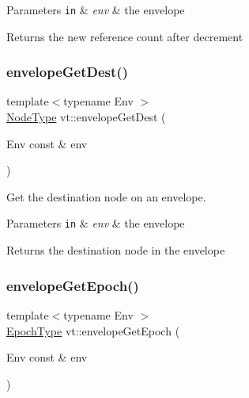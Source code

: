 \begin{DoxyParams}[1]{Parameters}
\mbox{\tt in}  & {\em env} & the envelope\\
\hline
\end{DoxyParams}
\begin{DoxyReturn}{Returns}
the new reference count after decrement 
\end{DoxyReturn}
\mbox{\label{namespacevt_a99cdbbb47f13203e14b01fa43bca99e9}} 
\subsubsection{\texorpdfstring{envelope\+Get\+Dest()}{envelopeGetDest()}}
{\footnotesize\ttfamily template$<$typename Env $>$ \\
\hyperlink{namespacevt_a866da9d0efc19c0a1ce79e9e492f47e2}{Node\+Type} vt\+::envelope\+Get\+Dest (\begin{DoxyParamCaption}\item[{Env const \&}]{env }\end{DoxyParamCaption})\hspace{0.3cm}{\ttfamily [inline]}}



Get the destination node on an envelope. 


\begin{DoxyParams}[1]{Parameters}
\mbox{\tt in}  & {\em env} & the envelope\\
\hline
\end{DoxyParams}
\begin{DoxyReturn}{Returns}
the destination node in the envelope 
\end{DoxyReturn}
\mbox{\label{namespacevt_ad5495e7900227550b44837e899c5bb13}} 
\subsubsection{\texorpdfstring{envelope\+Get\+Epoch()}{envelopeGetEpoch()}}
{\footnotesize\ttfamily template$<$typename Env $>$ \\
\hyperlink{namespacevt_a985a5adf291c34a3ca263b3378388236}{Epoch\+Type} vt\+::envelope\+Get\+Epoch (\begin{DoxyParamCaption}\item[{Env const \&}]{env }\end{DoxyParamCaption})\hspace{0.3cm}{\ttfamily [inline]}}



